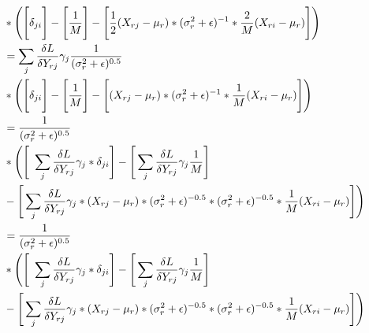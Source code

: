 \begin{align*}
    &* \Bigg(\Bigg[\delta_{ji}\Bigg] 
    - \Bigg[\frac{1}{M} \Bigg]
    - \Bigg[
        \frac{1}{2} (X_{rj} - \mu_r) * (\sigma_r^2 + \epsilon)^{-1 } * \frac{2}{M} (X_{ri} - \mu_r)
    \Bigg] \Bigg) \\
    &= \sum_{j} \frac{\delta L}{\delta Y_{rj}} \gamma_j \frac{1}{(\sigma_r^2 + \epsilon)^{0.5}} \\
    &* \Bigg(\Bigg[\delta_{ji}\Bigg] 
    - \Bigg[\frac{1}{M} \Bigg]
    - \Bigg[
        (X_{rj} - \mu_r) * (\sigma_r^2 + \epsilon)^{-1 } * \frac{1}{M} (X_{ri} - \mu_r)
    \Bigg] \Bigg) \\
    &= \frac{1}{(\sigma_r^2 + \epsilon)^{0.5}} \\
    &* \Bigg(\Bigg[\
        \sum_{j} \frac{\delta L}{\delta Y_{rj}} \gamma_j * \delta_{ji}
    \Bigg] 
    - \Bigg[
        \sum_{j} \frac{\delta L}{\delta Y_{rj}} \gamma_j \frac{1}{M} 
    \Bigg] \\
    &- \Bigg[
        \sum_{j} \frac{\delta L}{\delta Y_{rj}} \gamma_j *
        (X_{rj} - \mu_r) * (\sigma_r^2 + \epsilon)^{-0.5 } *(\sigma_r^2 + \epsilon)^{-0.5 } * \frac{1}{M} (X_{ri} - \mu_r)
    \Bigg] \Bigg) \\
    &= \frac{1}{(\sigma_r^2 + \epsilon)^{0.5}} \\
    &* \Bigg(\Bigg[\
        \sum_{j} \frac{\delta L}{\delta Y_{rj}} \gamma_j * \delta_{ji}
    \Bigg] 
    - \Bigg[
        \sum_{j} \frac{\delta L}{\delta Y_{rj}} \gamma_j \frac{1}{M} 
    \Bigg] \\
    &- \Bigg[
        \sum_{j} \frac{\delta L}{\delta Y_{rj}} \gamma_j *
        (X_{rj} - \mu_r) * (\sigma_r^2 + \epsilon)^{-0.5 } *(\sigma_r^2 + \epsilon)^{-0.5 } * \frac{1}{M} (X_{ri} - \mu_r)
    \Bigg] \Bigg) \\
    \pagebreak
\end{align*}

